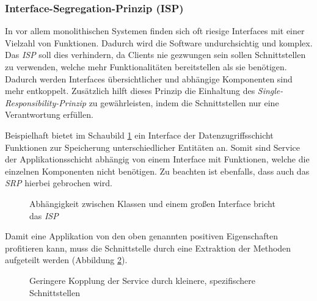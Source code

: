 \documentclass[conference]{IEEEtran}
\begin{document}
\subsubsection{Interface-Segregation-Prinzip (ISP)} In vor allem monolithischen Systemen finden sich oft riesige Interfaces mit einer Vielzahl von Funktionen. Dadurch wird die Software undurchsichtig und komplex. Das \emph{ISP} soll dies verhindern, da Clients nie gezwungen sein sollen Schnittstellen zu verwenden, welche mehr Funktionalitäten bereitstellen als sie benötigen. Dadurch werden Interfaces übersichtlicher und abhängige Komponenten sind mehr entkoppelt. Zusätzlich hilft dieses Prinzip die Einhaltung des \emph{Single-Responsibility-Prinzip} zu gewährleisten, indem die Schnittstellen nur eine Verantwortung erfüllen.  \cite{Martin.2003} \cite{Martin.2018}

Beispielhaft bietet im Schaubild \ref{fig:VorISP} ein Interface der Datenzugriffsschicht Funktionen zur Speicherung unterschiedlicher Entitäten an. Somit sind Service der Applikationsschicht abhängig von einem Interface mit Funktionen, welche die einzelnen Komponenten nicht benötigen. Zu beachten ist ebenfalls, dass auch das \emph{SRP} hierbei gebrochen wird.

\begin{figure}[htbp]
	\small
	
	\caption{Abhängigkeit zwischen Klassen und einem großen Interface bricht das \emph{ISP} }
	\label{fig:VorISP}
\end{figure}

Damit eine Applikation von den oben genannten positiven Eigenschaften profitieren kann, muss die Schnittstelle durch eine Extraktion der Methoden aufgeteilt werden (Abbildung \ref{fig:NachISP}).

\begin{figure}[htbp]
	\small
	
	\caption{Geringere Kopplung der Service durch kleinere, spezifischere Schnittstellen} 
	\label{fig:NachISP}
\end{figure}
\end{document}
